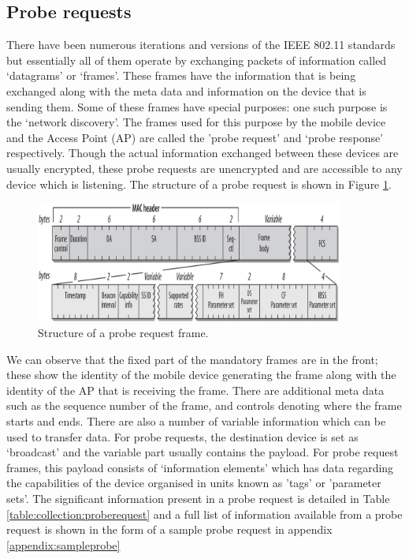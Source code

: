 \subsection{Probe requests}

There have been numerous iterations and versions of the IEEE 802.11 standards but essentially all of them operate by exchanging packets of information called `datagrams' or `frames'.
These frames have the information that is being exchanged along with the meta data and information on the device that is sending them.
Some of these frames have special purposes: one such purpose is the `network discovery'.
The frames used for this purpose by the mobile device and the Access Point (AP) are called the 'probe request' and `probe response' respectively.
Though the actual information exchanged between these devices are usually encrypted, these probe requests are unencrypted and are accessible to any device which is listening.
The structure of a probe request is shown in Figure \ref{figure:collection:proberequest}.

\begin{figure}
  \includegraphics[width=0.9\textwidth,trim={0 -30 0 -10},clip]{images/probe-request-structure.png}
  \caption{Structure of a probe request frame. }
  \label{figure:collection:proberequest}
\end{figure}

We can observe that the fixed part of the mandatory frames are in the front; these show the identity of the mobile device generating the frame along with the identity of the AP that is receiving the frame.
There are additional meta data such as the sequence number of the frame, and controls denoting where the frame starts and ends.
There are also a number of variable information which can be used to transfer data.
For probe requests, the destination device is set as `broadcast' and the variable part usually contains the payload.
For probe request frames, this payload consists of `information elements' which has data regarding the capabilities of the device organised in units known as 'tags' or 'parameter sets'.
The significant information present in a probe request is detailed in Table \ref{table:collection:proberequest} and a full list of information available from a probe request is shown in the form of a sample probe request in appendix \ref{appendix:sampleprobe}

